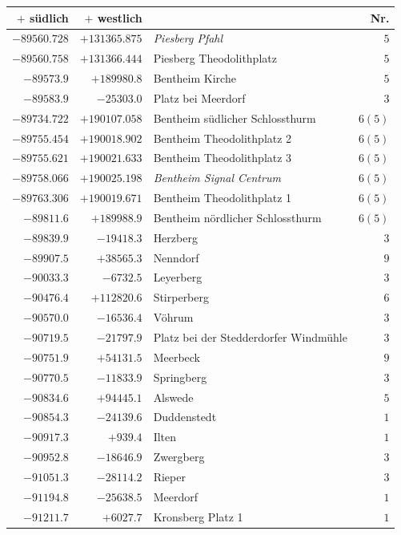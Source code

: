 \clearpage{}%
\begin{center}\begingroup\fontsize{8}{9}\selectfont
\setlength{\tabcolsep}{4pt}
\begin{tabular}{r|r|p{170pt}|r}\hline
\(+\) südlich&\(+\) westlich&&Nr.\\\hline
\(-89560.728\)&\(+131365.875\)&\textit{Piesberg Pfahl}&\(5\)\\
\(-89560.758\)&\(+131366.444\)&Piesberg Theodolithplatz&\(5\)\\
\(-89573.9\)&\(+189980.8\)&Bentheim Kirche&\(5\)\\
\(-89583.9\)&\(-25303.0\)&Platz bei Meerdorf&\(3\)\\
\(-89734.722\)&\(+190107.058\)&Bentheim südlicher Schlossthurm&\(6 (5)\)\\
\(-89755.454\)&\(+190018.902\)&Bentheim Theodolithplatz 2&\(6 (5)\)\\
\(-89755.621\)&\(+190021.633\)&Bentheim Theodolithplatz 3&\(6 (5)\)\\
\(-89758.066\)&\(+190025.198\)&\textit{Bentheim Signal Centrum}&\(6 (5)\)\\
\(-89763.306\)&\(+190019.671\)&Bentheim Theodolithplatz 1&\(6 (5)\)\\
\(-89811.6\)&\(+189988.9\)&Bentheim nördlicher Schlossthurm&\(6 (5)\)\\
\(-89839.9\)&\(-19418.3\)&Herzberg&\(3\)\\
\(-89907.5\)&\(+38565.3\)&Nenndorf&\(9\)\\
\(-90033.3\)&\(-6732.5\)&Leyerberg&\(3\)\\
\(-90476.4\)&\(+112820.6\)&Stirperberg&\(6\)\\
\(-90570.0\)&\(-16536.4\)&Vöhrum&\(3\)\\
\(-90719.5\)&\(-21797.9\)&Platz bei der Stedderdorfer Windmühle&\(3\)\\
\(-90751.9\)&\(+54131.5\)&Meerbeck&\(9\)\\
\(-90770.5\)&\(-11833.9\)&Springberg&\(3\)\\
\(-90834.6\)&\(+94445.1\)&Alswede&\(5\)\\
\(-90854.3\)&\(-24139.6\)&Duddenstedt&\(1\)\\
\(-90917.3\)&\(+939.4\)&Ilten&\(1\)\\
\(-90952.8\)&\(-18646.9\)&Zwergberg&\(3\)\\
\(-91051.3\)&\(-28114.2\)&Rieper&\(3\)\\
\(-91194.8\)&\(-25638.5\)&Meerdorf&\(1\)\\
\(-91211.7\)&\(+6027.7\)&Kronsberg Platz 1&\(1\)\\

\end{tabular}
\end{center}
